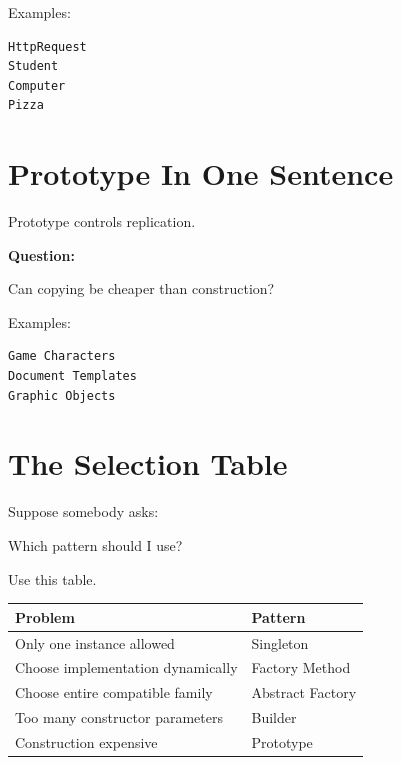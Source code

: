 \documentclass[11pt,a4paper]{book}
\begin{document}
Examples:

\begin{verbatim}
HttpRequest
Student
Computer
Pizza
\end{verbatim}


\section{Prototype In One Sentence}

\begin{idea}

Prototype controls replication.

\end{idea}

\textbf{Question:}

\begin{center}
Can copying be cheaper than construction?
\end{center}

Examples:

\begin{verbatim}
Game Characters
Document Templates
Graphic Objects
\end{verbatim}


\section{The Selection Table}

Suppose somebody asks:

\begin{center}
Which pattern should I use?
\end{center}

Use this table.

\begin{center}

\begin{tabular}{|p{7cm}|p{4cm}|}
\hline
Problem & Pattern \\
\hline
Only one instance allowed & Singleton \\
\hline
Choose implementation dynamically & Factory Method \\
\hline
Choose entire compatible family & Abstract Factory \\
\hline
Too many constructor parameters & Builder \\
\hline
Construction expensive & Prototype \\
\hline
\end{tabular}

\end{center}
\end{document}
